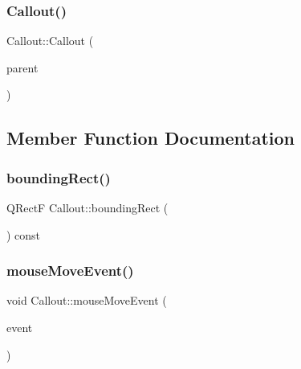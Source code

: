 \subsubsection{\texorpdfstring{Callout()}{Callout()}}
{\footnotesize\ttfamily Callout\+::\+Callout (\begin{DoxyParamCaption}\item[{Q\+Chart $\ast$}]{parent }\end{DoxyParamCaption})}



\subsection{Member Function Documentation}
\mbox{\label{class_callout_a4ec6f6df3848b957f3c45177830fedcb}} 
\subsubsection{\texorpdfstring{bounding\+Rect()}{boundingRect()}}
{\footnotesize\ttfamily Q\+RectF Callout\+::bounding\+Rect (\begin{DoxyParamCaption}{ }\end{DoxyParamCaption}) const}

\mbox{\label{class_callout_a37dfa3540fd589d0ae39949c8264ff39}} 
\subsubsection{\texorpdfstring{mouse\+Move\+Event()}{mouseMoveEvent()}}
{\footnotesize\ttfamily void Callout\+::mouse\+Move\+Event (\begin{DoxyParamCaption}\item[{Q\+Graphics\+Scene\+Mouse\+Event $\ast$}]{event }\end{DoxyParamCaption})\hspace{0.3cm}{\ttfamily [protected]}}

\mbox{\label{class_callout_af5565beb8739b7bdf5f525004a8b9ab7}} 
